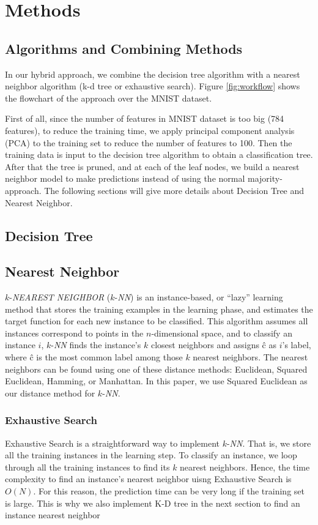 \section{Methods}
	\subsection{Algorithms and Combining Methods}
		In our hybrid approach, we combine the decision tree algorithm with a nearest neighbor algorithm (k-d tree or exhaustive search). Figure \ref{fig:workflow} shows the flowchart of the approach over the MNIST dataset. 
		
		First of all, since the number of features in MNIST dataset is too big (784 features), to reduce the training time, we apply principal component analysis (PCA) to the training set to reduce the number of features to 100. Then the training data is input to the decision tree algorithm to obtain a classification tree. After that the tree is pruned, and at each of the leaf nodes, we build a nearest neighbor model to make predictions instead of using the normal majority-approach. The following sections will give more details about Decision Tree and Nearest Neighbor.
		
	\subsection{Decision Tree}
    
	\subsection{Nearest Neighbor}
		$k$-\textit{NEAREST NEIGHBOR} ($k$-\textit{NN}) is an instance-based, or ``lazy'' learning method that stores the training examples in the learning phase, and estimates the target function for each new instance to be classified. This algorithm assumes all instances correspond to points in the $n$-dimensional space, and to classify an instance $i$, $k$-\textit{NN} finds the instance's $k$ closest neighbors and assigns \^{c} as $i$'s label, where \^{c} is the most common label among those $k$ nearest neighbors. The nearest neighbors can be found using one of these distance methods: Euclidean, Squared Euclidean, Hamming, or Manhattan. In this paper, we use Squared Euclidean as our distance method for $k$-\textit{NN}.
		\subsubsection{Exhaustive Search}
		Exhaustive Search is a straightforward way to implement $k$-\textit{NN}. That is, we store all the training instances in the learning step. To classify an instance, we loop through all the training instances to find its $k$ nearest neighbors. Hence, the time complexity to find an instance's nearest neighbor uisng Exhaustive Search is $O(N)$. For this reason, the prediction time can be very long if the training set is large. This is why we also implement K-D tree in the next section to find an instance nearest neighbor
		
